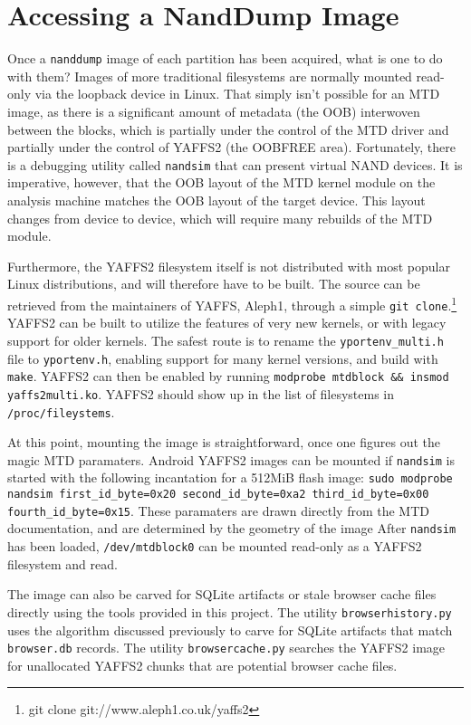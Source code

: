 \section{Accessing a NandDump Image}

Once a \texttt{nanddump} image of each partition has been acquired, what is one to do with them?  Images of more traditional
filesystems are normally mounted read-only via the loopback device in Linux.  That simply isn't possible for an MTD image, as there
is a significant amount of metadata (the OOB) interwoven between the blocks, which is partially under the control of the MTD driver
and partially under the control of YAFFS2 (the OOBFREE area).  Fortunately, there is a debugging utility called \texttt{nandsim}
that can present virtual NAND devices.  It is imperative, however, that the OOB layout of the MTD kernel module on the analysis
machine matches the OOB layout of the target device.  This layout changes from device to device, which will require many rebuilds of
the MTD module. 

Furthermore, the YAFFS2 filesystem itself is not distributed with most popular Linux distributions, and will therefore have to be built.
The source can be retrieved from the maintainers of YAFFS, Aleph1, through a simple \texttt{git clone}.\footnote{git clone git://www.aleph1.co.uk/yaffs2\cite{gityaffs}} YAFFS2 can be built to utilize the features of very new kernels, or with legacy support for older kernels. 
The safest route is to rename the \texttt{yportenv\_multi.h} file to \texttt{yportenv.h}, enabling support for many kernel versions, and build with \texttt{make}. 
YAFFS2 can then be enabled by running \texttt{modprobe mtdblock \&\& insmod yaffs2multi.ko}. 
YAFFS2 should show up in the list of filesystems in \texttt{/proc/fileystems}.

At this point, mounting the image is straightforward, once one figures out the magic MTD paramaters.
Android YAFFS2 images can be mounted if \texttt{nandsim} is started with the following incantation for a 512MiB flash image:
\texttt{sudo modprobe nandsim first\_id\_byte=0x20 second\_id\_byte=0xa2 third\_id\_byte=0x00 fourth\_id\_byte=0x15}.
These paramaters are drawn directly from the MTD documentation, and are determined by the geometry of the image \cite{mtdfaq}
After \texttt{nandsim} has been loaded, \texttt{/dev/mtdblock0} can be mounted read-only as a YAFFS2 filesystem and read.

The image can also be carved for SQLite artifacts or stale browser cache files directly using the tools provided in this project.
The utility \texttt{browserhistory.py} uses the algorithm discussed previously to carve for SQLite artifacts that match \texttt{browser.db} records.
The utility \texttt{browsercache.py} searches the YAFFS2 image for unallocated YAFFS2 chunks that are potential browser cache files.

